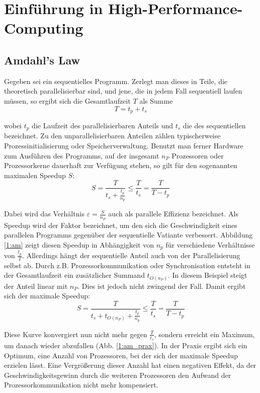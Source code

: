 	\chapter{Einf\"uhrung in High-Performance-Computing} 
		\section{Amdahl's Law}
		Gegeben sei ein sequentielles Programm. Zerlegt man dieses in Teile, die theoretisch parallelisierbar sind, und jene, die in jedem Fall sequentiell laufen müssen, so ergibt sich die Gesamtlaufzeit $T$ als Summe 
		\begin{equation}\label{eq1:am}
		    T = t_p + t_s
        	\end{equation}
        	
        	wobei $t_p$ die Laufzeit des parallelisierbaren Anteils und $t_s$ die des sequentiellen bezeichnet. Zu den unparallelisierbaren Anteilen zählen typischerweise Prozessinitialisierung oder Speicherverwaltung. Benutzt man ferner Hardware zum Ausführen des Programms, auf der insgesamt $n_P$ Prozessoren oder Prozessorkerne dauerhaft zur Verfügung stehen, so gilt für den sogenannten maximalen Speedup $S$:
		\begin{equation}
		    S = \frac{T}{t_s + \frac{t_p}{n_p}} \leq \frac{T}{t_s} = \frac{T}{T-t_p}
        	\end{equation}	   
		
		Dabei wird das Verhältnis $\varepsilon = \frac{S}{n_P}$ auch als \gls{parallele Effizienz} bezeichnet. Als \Gls{Speedup} wird der Faktor bezeichnet, um den sich die Geschwindigkeit eines parallelen Programms gegenüber der sequentielle Vatiante verbessert. Abbildung \ref{1:am} zeigt diesen Speedup in Abhängigkeit von $n_p$ für verschiedene Verhältnisse von $\frac{t_p}{T}$.
		Allerdings hängt der sequentielle Anteil auch von der Parallelisierung selbst ab. Durch z.B. Prozessorkommunikation oder Synchronisation entsteht in der Gesamtlaufzeit ein zusätzlicher Summand	$t_{O(n_P)}$. In diesem Beispiel steigt der Anteil linear mit $n_P$. Dies ist jedoch nicht zwingend der Fall. Damit ergibt sich der maximale \Gls{Speedup}:		
		\begin{equation}
		    S = \frac{T}{t_s + t_{O(n_P)} + \frac{t_p}{n_p}} \leq \frac{T}{t_s} = \frac{T}{T-t_p}		
		\end{equation}
		
		Diese Kurve konvergiert nun nicht mehr gegen $\frac{T}{t_s}$, sondern erreicht ein Maximum, um danach wieder abzufallen (Abb. \ref{1:am_prax}). In der Praxis ergibt sich ein Optimum, eine Anzahl von Prozessoren, bei der sich der maximale \Gls{Speedup} erzielen lässt. Eine Vergrößerung dieser Anzahl hat einen negativen Effekt, da der Geschwindigkeitsgewinn durch die weiteren Prozessoren den Aufwand der Prozessorkommunikation nicht mehr kompensiert.


